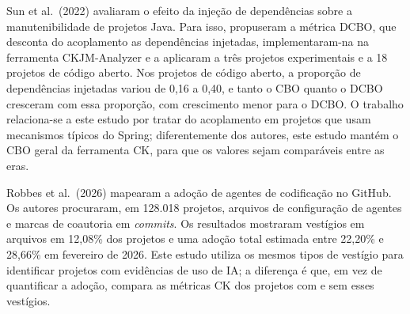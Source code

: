 Sun et al.\ (2022)\nocite{sun:22} avaliaram o efeito da injeção de dependências sobre a manutenibilidade de projetos Java. Para isso, propuseram a métrica DCBO, que desconta do acoplamento as dependências injetadas, implementaram-na na ferramenta CKJM-Analyzer e a aplicaram a três projetos experimentais e a 18 projetos de código aberto. Nos projetos de código aberto, a proporção de dependências injetadas variou de 0,16 a 0,40, e tanto o CBO quanto o DCBO cresceram com essa proporção, com crescimento menor para o DCBO. O trabalho relaciona-se a este estudo por tratar do acoplamento em projetos que usam mecanismos típicos do Spring; diferentemente dos autores, este estudo mantém o CBO geral da ferramenta CK, para que os valores sejam comparáveis entre as eras.

Robbes et al.\ (2026)\nocite{robbes:26} mapearam a adoção de agentes de codificação no GitHub. Os autores procuraram, em 128.018 projetos, arquivos de configuração de agentes e marcas de coautoria em \emph{commits}. Os resultados mostraram vestígios em arquivos em 12,08\% dos projetos e uma adoção total estimada entre 22,20\% e 28,66\% em fevereiro de 2026. Este estudo utiliza os mesmos tipos de vestígio para identificar projetos com evidências de uso de IA; a diferença é que, em vez de quantificar a adoção, compara as métricas CK dos projetos com e sem esses vestígios.
